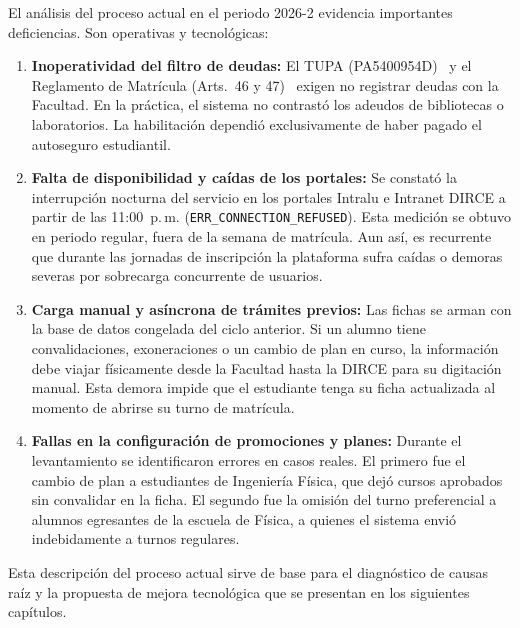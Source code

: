 El an\'alisis del proceso actual en el periodo 2026-2 evidencia importantes deficiencias. Son operativas y tecnol\'ogicas:
\begin{enumerate}
    \item \textbf{Inoperatividad del filtro de deudas:} El TUPA (PA5400954D)~\cite{tupa2024} y el Reglamento de Matr\'icula (Arts.~46\textdegree{} y 47\textdegree{})~\cite{reglamento2022} exigen no registrar deudas con la Facultad. En la pr\'actica, el sistema no contrast\'o los adeudos de bibliotecas o laboratorios. La habilitaci\'on dependi\'o exclusivamente de haber pagado el autoseguro estudiantil.
    \item \textbf{Falta de disponibilidad y ca\'idas de los portales:} Se constat\'o la interrupci\'on nocturna del servicio en los portales Intralu e Intranet DIRCE a partir de las 11:00~p.\,m. (\texttt{ERR\_CONNECTION\_REFUSED}). Esta medici\'on se obtuvo en periodo regular, fuera de la semana de matr\'icula. Aun as\'i, es recurrente que durante las jornadas de inscripci\'on la plataforma sufra ca\'idas o demoras severas por sobrecarga concurrente de usuarios.
    \item \textbf{Carga manual y as\'incrona de tr\'amites previos:} Las fichas se arman con la base de datos congelada del ciclo anterior. Si un alumno tiene convalidaciones, exoneraciones o un cambio de plan en curso, la informaci\'on debe viajar f\'isicamente desde la Facultad hasta la DIRCE para su digitaci\'on manual. Esta demora impide que el estudiante tenga su ficha actualizada al momento de abrirse su turno de matr\'icula.
    \item \textbf{Fallas en la configuraci\'on de promociones y planes:} Durante el levantamiento se identificaron errores en casos reales. El primero fue el cambio de plan a estudiantes de Ingenier\'ia F\'isica, que dej\'o cursos aprobados sin convalidar en la ficha. El segundo fue la omisi\'on del turno preferencial a alumnos egresantes de la escuela de F\'isica, a quienes el sistema envi\'o indebidamente a turnos regulares.
\end{enumerate}

Esta descripci\'on del proceso actual sirve de base para el diagn\'ostico de causas ra\'iz y la propuesta de mejora tecnol\'ogica que se presentan en los siguientes cap\'itulos.
